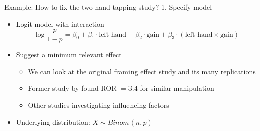 \documentclass[aspectratio=169]{beamer}
\begin{document}
\begin{frame}{Example: How to fix the two-hand tapping study?}
  {1. Specify model}
  \begin{itemize}
    \item Logit model with interaction
  \[
  \log \frac{p}{1 - p} = \beta_0
                  + \beta_1 \cdot \text{left hand}
                  + \beta_2 \cdot \text{gain}
                  + \beta_3 \cdot (\text{left hand} \times \text{gain})
\]
    \item Suggest a minimum relevant effect
      \begin{itemize}
        \item We can look at the original framing effect study and its many replications
        \item Former study by \citet{McElroySeta03} found ROR $= 3.4$ for
          similar manipulation
        \item Other studies investigating influencing factors
        \citep[with RORs $\approx$ 2--3, e.\,g., foreign language
      effect,][]{CostaFoucart14, Wickelmaier15}
      \end{itemize}
    \item Underlying distribution: $X \sim Binom(n, p)$
  \end{itemize}
\end{frame}

% 
% 
% 
% 
% 
% 
% 
\end{document}

